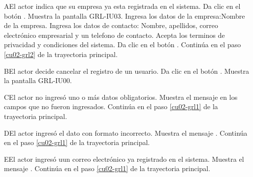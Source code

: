  \clearpage
\begin{UCtrayectoriaA}{A}{El actor indica que su empresa ya esta registrada en el sistema.}
	\UCpaso [\UCactor] Da clic en el botón .
	\UCpaso [\UCsist] Muestra la pantalla GRL-IU03.
	\UCpaso [\UCactor] Ingresa los datos de la empresa:Nombre de la empresa.
	\UCpaso [\UCactor] Ingresa los datos de contacto: Nombre, apellidos, correo electrónico empresarial y un telefono de contacto.
	\UCpaso [\UCactor] Acepta los terminos de privacidad y condiciones del sistema.
	\UCpaso [\UCactor] Da clic en el botón . 
	\UCpaso [\UCsist] Continúa en el paso \ref{cu02-grl2} de la trayectoria principal.
\end{UCtrayectoriaA} 

\begin{UCtrayectoriaA}{B}{El actor decide cancelar el registro de un usuario.}
	\UCpaso [\UCactor] Da clic en el botón .
	\UCpaso [\UCsist] Muestra la pantalla GRL-IU00.
\end{UCtrayectoriaA} 

\begin{UCtrayectoriaA}{C}{El actor no ingresó uno o más datos obligatorios.}
	\UCpaso [\UCsist] Muestra el mensaje  en los campos que no
	fueron ingresados.
	\UCpaso [\UCsist] Continúa en el paso \ref{cu02-grl1} de la trayectoria principal.
\end{UCtrayectoriaA} 

\begin{UCtrayectoriaA}{D}{El actor ingresó el dato con formato incorrecto.}
	\UCpaso [\UCsist] Muestra el mensaje .
	\UCpaso [\UCsist] Continúa en el paso \ref{cu02-grl1} de la trayectoria principal.
\end{UCtrayectoriaA} 

\begin{UCtrayectoriaA}{E}{El actor ingresó uun correo electrónico ya registrado en el sistema.}
	\UCpaso [\UCsist] Muestra el mensaje .
	\UCpaso [\UCsist] Continúa en el paso \ref{cu02-grl1} de la trayectoria principal.
\end{UCtrayectoriaA} 